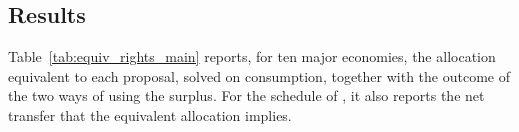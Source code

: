 \documentclass[12pt,english]{article}
\theoremstyle{remark}
\begin{document}

\subsection{Results}

Table~\ref{tab:equiv_rights_main} reports, for ten major economies, the allocation equivalent to each proposal, solved on consumption, together with the outcome of the two ways of using the surplus. For the schedule of \citet{banerjee_grand_2025}, it also reports the net transfer that the equivalent allocation implies.
\end{document}

